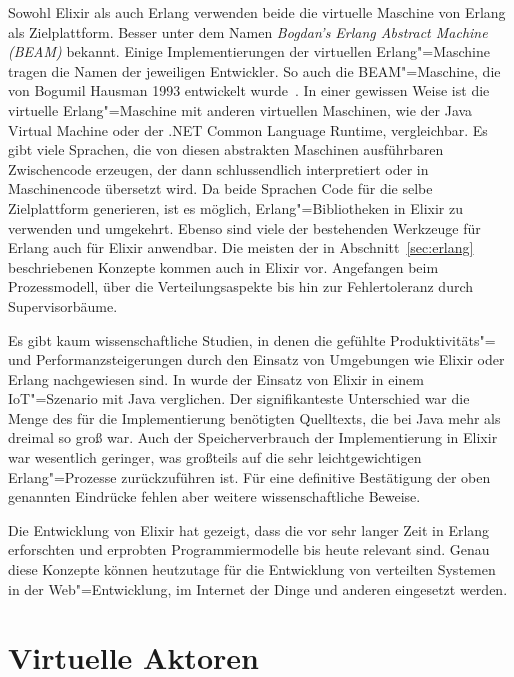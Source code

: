 Sowohl Elixir als auch Erlang verwenden beide die virtuelle  Maschine von Erlang als Zielplattform. Besser unter dem Namen \textit{Bogdan's Erlang Abstract Machine (BEAM)} bekannt. Einige Implementierungen der virtuellen Erlang"=Maschine tragen die Namen der jeweiligen Entwickler. So auch die BEAM"=Maschine, die von Bogumil Hausman 1993 entwickelt wurde~\cite[12]{Armstrong:2007:HE:1238844.1238850}. In einer gewissen Weise ist die virtuelle Erlang"=Maschine mit anderen virtuellen Maschinen, wie der Java Virtual Machine oder der .NET Common Language Runtime, vergleichbar. Es gibt viele Sprachen, die von diesen abstrakten Maschinen ausführbaren Zwischencode erzeugen, der dann schlussendlich interpretiert oder in Maschinencode übersetzt wird.
Da beide Sprachen Code für die selbe Zielplattform generieren, ist es möglich, Erlang"=Bibliotheken in Elixir zu verwenden und umgekehrt. Ebenso sind viele der bestehenden Werkzeuge für Erlang auch für Elixir anwendbar. Die meisten der in Abschnitt~\ref{sec:erlang} beschriebenen Konzepte kommen auch in Elixir vor. Angefangen beim Prozessmodell, über die Verteilungsaspekte bis hin zur Fehlertoleranz durch Supervisorbäume.

Es gibt kaum wissenschaftliche Studien, in denen die gefühlte Produktivitäts"= und Performanzsteigerungen durch den Einsatz von Umgebungen wie Elixir oder Erlang nachgewiesen sind. In \cite{ElixirIot} wurde der Einsatz von Elixir in einem IoT"=Szenario mit Java verglichen. Der signifikanteste Unterschied war die Menge des für die Implementierung benötigten Quelltexts, die bei Java mehr als dreimal so groß war. Auch der Speicherverbrauch der Implementierung in Elixir war wesentlich geringer, was großteils auf die sehr leichtgewichtigen Erlang"=Prozesse zurückzuführen ist. Für eine definitive Bestätigung der oben genannten Eindrücke fehlen aber weitere wissenschaftliche Beweise.

Die Entwicklung von Elixir hat gezeigt, dass die vor sehr langer Zeit in Erlang erforschten und erprobten Programmiermodelle bis heute relevant sind. Genau diese Konzepte können heutzutage für die Entwicklung von verteilten Systemen in der Web"=Entwicklung, im Internet der Dinge und anderen eingesetzt werden.

\section{Virtuelle Aktoren}


